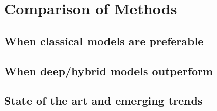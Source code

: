 
\chapter{Comparison of Methods}
\label{cha:Comparison of Methods}

\section{When classical models are preferable}
\label{sec:When classical models are preferable}

\section{When deep/hybrid models outperform}
\label{sec:When deep/hybrid models outperform}

\section{State of the art and emerging trends}
\label{sec:State of the art and emerging trends}